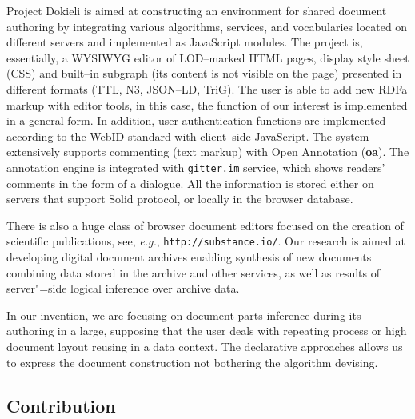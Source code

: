 \documentclass[conference,a4paper]{IEEEtran}
\providecommand\url[1]{\texttt{#1}}
\begin{document}
Project Dokieli \cite{b14} is aimed at constructing an environment for shared document authoring by integrating various algorithms, services, and vocabularies located on different servers \cite{b14} and implemented as JavaScript modules.  The project is, essentially, a WYSIWYG editor of LOD--marked HTML pages, display style sheet (CSS) and built--in subgraph (its content is not visible on the page) presented in different formats (TTL, N3, JSON--LD, TriG).  The user is able to add new RDFa markup with editor tools, in this case, the function of our interest is implemented in a general form.  In addition, user authentication functions are implemented according to the WebID standard with client--side JavaScript.  The system extensively supports commenting (text markup) with Open Annotation (\textbf{oa}).  The annotation engine is integrated with \texttt{gitter.im} service, which shows readers' comments in the form of a dialogue.  All the information is stored either on servers that support Solid protocol, or locally in the browser database.

There is also a huge class of browser document editors focused on the creation of scientific publications, see, \textit{e.g.}, \url{http://substance.io/}.
Our research is aimed at developing digital document archives enabling synthesis of new documents combining data stored in the archive and other services, as well as results of server"=side logical inference over archive data.

In our invention, we are focusing on document parts inference during its authoring in a large, supposing that the user deals with repeating process or high document layout reusing in a data context.  The declarative approaches allows us to express the document construction not bothering the algorithm devising.

\subsection{Contribution}
\label{sec:contr}
\end{document}

